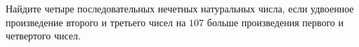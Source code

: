 \begin{ex}
	\begin{condition}
		Найдите четыре последовательных нечетных натуральных числа, если удвоенное
		произведение второго и третьего чисел на \( 107 \) больше произведения первого и четвертого
		чисел.
	\end{condition}
\end{ex}